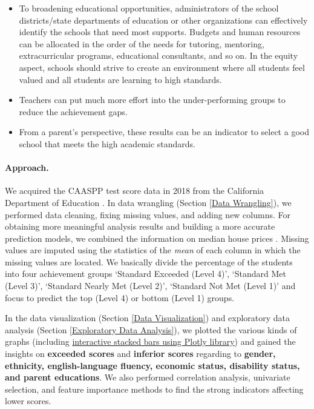 \documentclass[11pt]{article}
\begin{document}
\begin{itemize}
\item To broadening educational opportunities, administrators of the school districts/state departments of education or other organizations can effectively identify the schools that need most supports. Budgets and human resources can be allocated in the order of the needs for tutoring, mentoring, extracurricular programs, educational consultants, and so on. In the equity aspect, schools should strive to create an environment where all students feel valued and all students are learning to high standards. 
\item Teachers can put much more effort into the under-performing groups to reduce the achievement gaps. 
\item From a parent’s perspective, these results can be an indicator to select a good school that meets the high academic standards.
\end{itemize}

\paragraph*{Approach.}

We acquired the CAASPP test score data in 2018 from the California Department of Education \cite{california_dep_education, california_dep_education_caaspp, CAASPP_research}. 
In data wrangling (Section \ref{Data Wrangling}), we performed data cleaning, fixing missing values, and adding new columns.
%
For obtaining more meaningful analysis results and building a more accurate prediction models, we combined the information on median house prices \cite{Zillow_research_data, Civil_Rights_Data_Collection}. 
%
Missing values are imputed using the statistics of the \textit{mean} of each column in which the missing values are located.
%
We basically divide
the percentage of the students 
into four achievement groups ‘Standard Exceeded (Level 4)’, ‘Standard Met (Level 3)’, ‘Standard Nearly Met (Level 2)’, ‘Standard Not Met (Level 1)’ and focus to predict the top (Level 4) or bottom (Level 1) groups.

%
In the data visualization (Section \ref{Data Visualization}) and exploratory data analysis (Section \ref{Exploratory Data Analysis}), we plotted the various kinds of graphs (including \href{https://github.com/ahrimhan/data-science-project/blob/master/project1/data_visualization.ipynb}{interactive stacked bars using Plotly library}) and gained the insights on \textbf{exceeded scores} and \textbf{inferior scores} regarding to \textbf{gender, ethnicity, english-language fluency, economic status, disability status, and parent educations}.
%
We also performed correlation analysis, univariate selection, and feature importance methods to find the strong indicators affecting lower scores. 
\end{document}

